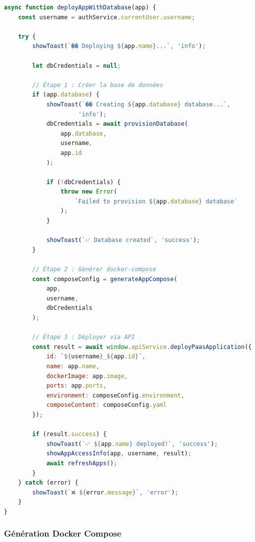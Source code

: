 \documentclass[12pt,a4paper]{article}
\begin{document}
\begin{lstlisting}[language=JavaScript,caption=Déploiement avec DB (paas-catalog.js)]
async function deployAppWithDatabase(app) {
    const username = authService.currentUser.username;
    
    try {
        showToast(`�� Deploying ${app.name}...`, 'info');
        
        let dbCredentials = null;
        
        // Étape 1 : Créer la base de données
        if (app.database) {
            showToast(`�� Creating ${app.database} database...`, 
                     'info');
            dbCredentials = await provisionDatabase(
                app.database, 
                username, 
                app.id
            );
            
            if (!dbCredentials) {
                throw new Error(
                    `Failed to provision ${app.database} database`
                );
            }
            
            showToast(`✅ Database created`, 'success');
        }
        
        // Étape 2 : Générer docker-compose
        const composeConfig = generateAppCompose(
            app, 
            username, 
            dbCredentials
        );
        
        // Étape 3 : Déployer via API
        const result = await window.apiService.deployPaasApplication({
            id: `${username}_${app.id}`,
            name: app.name,
            dockerImage: app.image,
            ports: app.ports,
            environment: composeConfig.environment,
            composeContent: composeConfig.yaml
        });
        
        if (result.success) {
            showToast(`✅ ${app.name} deployed!`, 'success');
            showAppAccessInfo(app, username, result);
            await refreshApps();
        }
    } catch (error) {
        showToast(`❌ ${error.message}`, 'error');
    }
}
\end{lstlisting}

\subsubsection{Génération Docker Compose}
\end{document}
